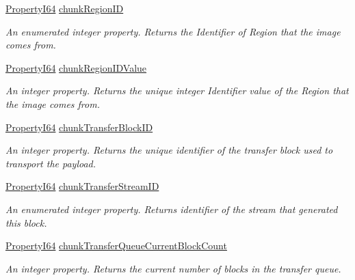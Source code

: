 \begin{DoxyCompactItemize}
\hyperlink{group___common_interface_ga81749b2696755513663492664a18a893}{Property\+I64} \hyperlink{classmv_i_m_p_a_c_t_1_1acquire_1_1_gen_i_cam_1_1_chunk_data_control_aca35041bfcc573ab5d91adb8e386bfcb}{chunk\+Region\+I\+D}
\begin{DoxyCompactList}\small\item\em An enumerated integer property. Returns the Identifier of Region that the image comes from. \end{DoxyCompactList}\item 
\hyperlink{group___common_interface_ga81749b2696755513663492664a18a893}{Property\+I64} \hyperlink{classmv_i_m_p_a_c_t_1_1acquire_1_1_gen_i_cam_1_1_chunk_data_control_a4bfe87b51e018b8e2b0b869950ffde7c}{chunk\+Region\+I\+D\+Value}
\begin{DoxyCompactList}\small\item\em An integer property. Returns the unique integer Identifier value of the Region that the image comes from. \end{DoxyCompactList}\item 
\hyperlink{group___common_interface_ga81749b2696755513663492664a18a893}{Property\+I64} \hyperlink{classmv_i_m_p_a_c_t_1_1acquire_1_1_gen_i_cam_1_1_chunk_data_control_a43f3d8e2284b6742b8b22186407dce52}{chunk\+Transfer\+Block\+I\+D}
\begin{DoxyCompactList}\small\item\em An integer property. Returns the unique identifier of the transfer block used to transport the payload. \end{DoxyCompactList}\item 
\hyperlink{group___common_interface_ga81749b2696755513663492664a18a893}{Property\+I64} \hyperlink{classmv_i_m_p_a_c_t_1_1acquire_1_1_gen_i_cam_1_1_chunk_data_control_a5d99e230c1a36d0649c93d6d6de2a139}{chunk\+Transfer\+Stream\+I\+D}
\begin{DoxyCompactList}\small\item\em An enumerated integer property. Returns identifier of the stream that generated this block. \end{DoxyCompactList}\item 
\hyperlink{group___common_interface_ga81749b2696755513663492664a18a893}{Property\+I64} \hyperlink{classmv_i_m_p_a_c_t_1_1acquire_1_1_gen_i_cam_1_1_chunk_data_control_a0eba9a22dc04bd1928c4807cb6dd45fe}{chunk\+Transfer\+Queue\+Current\+Block\+Count}
\begin{DoxyCompactList}\small\item\em An integer property. Returns the current number of blocks in the transfer queue. \end{DoxyCompactList}\item 

\end{DoxyCompactItemize}
